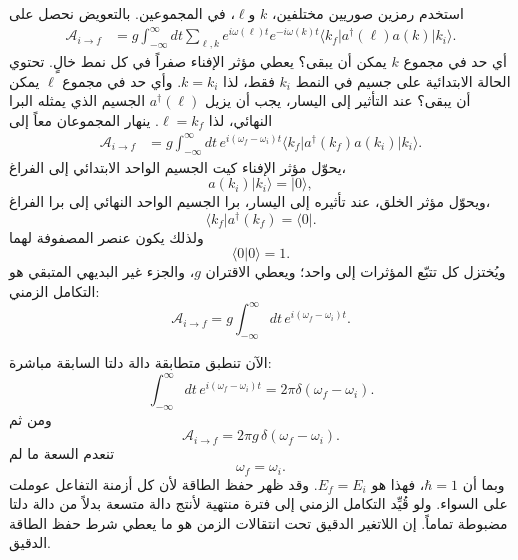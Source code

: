 استخدم رمزين صوريين مختلفين، \(k\) و\(\ell\)، في المجموعين. بالتعويض نحصل على
\begin{align}
\mathcal A_{i\to f}
&=g\int_{-\infty}^{\infty}dt
\sum_{\ell,k}
e^{i\omega(\ell)t}e^{-i\omega(k)t}
\langle k_f\rvert a^\dagger(\ell)a(k)\lvert k_i\rangle.
\end{align}
أي حد في مجموع \(k\) يمكن أن يبقى؟ يعطي مؤثر الإفناء صفراً في كل نمط خالٍ. تحتوي الحالة الابتدائية على جسيم في النمط \(k_i\) فقط، لذا \(k=k_i\). وأي حد في مجموع \(\ell\) يمكن أن يبقى؟ عند التأثير إلى اليسار، يجب أن يزيل \(a^\dagger(\ell)\) الجسيم الذي يمثله البرا النهائي، لذا \(\ell=k_f\). ينهار المجموعان معاً إلى
\begin{align}
\mathcal A_{i\to f}
&=g\int_{-\infty}^{\infty}dt\,
e^{i(\omega_f-\omega_i)t}
\langle k_f\rvert a^\dagger(k_f)a(k_i)\lvert k_i\rangle.
\end{align}
يحوّل مؤثر الإفناء كيت الجسيم الواحد الابتدائي إلى الفراغ،
\begin{equation}
a(k_i)\lvert k_i\rangle=\lvert0\rangle,
\end{equation}
ويحوّل مؤثر الخلق، عند تأثيره إلى اليسار، برا الجسيم الواحد النهائي إلى برا الفراغ،
\begin{equation}
\langle k_f\rvert a^\dagger(k_f)=\langle0\rvert.
\end{equation}
ولذلك يكون عنصر المصفوفة لهما
\begin{equation}
\langle0\vert0\rangle=1.
\end{equation}
ويُختزل كل تتبّع المؤثرات إلى واحد؛ ويعطي الاقتران \(g\)، والجزء غير البديهي المتبقي هو التكامل الزمني:
\begin{equation}
\mathcal A_{i\to f}
=g\int_{-\infty}^{\infty}dt\,
e^{i(\omega_f-\omega_i)t}.
\end{equation}


الآن تنطبق متطابقة دالة دلتا السابقة مباشرة:
\begin{equation}
\int_{-\infty}^{\infty}dt\,
e^{i(\omega_f-\omega_i)t}
=2\pi\delta(\omega_f-\omega_i).
\end{equation}
ومن ثم
\begin{equation}
\boxed{
\mathcal A_{i\to f}
=2\pi g\,\delta(\omega_f-\omega_i)
}.
\end{equation}
تنعدم السعة ما لم
\begin{equation}
\omega_f=\omega_i.
\end{equation}
وبما أن \(\hbar=1\)، فهذا هو \(E_f=E_i\). وقد ظهر حفظ الطاقة لأن كل أزمنة التفاعل عوملت على السواء. ولو قُيِّد التكامل الزمني إلى فترة منتهية لأنتج دالة متسعة بدلاً من دالة دلتا مضبوطة تماماً. إن اللاتغير الدقيق تحت انتقالات الزمن هو ما يعطي شرط حفظ الطاقة الدقيق.

